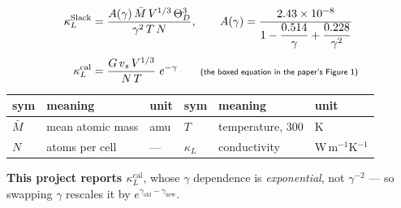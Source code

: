 \begin{frame}

\begin{align}
\kappa_L^{\text{Slack}} &=
  \frac{A(\gamma)\,\bar{M}\,V^{1/3}\,\Theta_D^{3}}{\gamma^{2}\,T\,N},
  \qquad A(\gamma) = \frac{2.43\times10^{-8}}{1 - \dfrac{0.514}{\gamma} + \dfrac{0.228}{\gamma^{2}}} \\[3pt]
\kappa_L^{\text{cal}} &= \frac{G\,v_s\,V^{1/3}}{N\,T}\;e^{-\gamma}
  \qquad\text{\sffamily\scriptsize (the boxed equation in the paper's Figure 1)}
\end{align}

\vspace{1pt}
\begin{center}
{\sffamily\scriptsize
\begin{tabular}{@{}llllll@{}}
\toprule
sym & meaning & unit & sym & meaning & unit \\
\midrule
$\bar{M}$ & mean atomic mass & amu & $T$ & temperature, 300 & K \\
$N$ & atoms per cell & --- & $\kappa_L$ & conductivity & W\,m$^{-1}$K$^{-1}$ \\
\bottomrule
\end{tabular}}
\end{center}

\vspace{1pt}
{\sffamily\scriptsize
\textbf{This project reports $\kappa_L^{\text{cal}}$}, whose $\gamma$ dependence
is \emph{exponential}, not $\gamma^{-2}$ --- so swapping $\gamma$ rescales it by
$e^{\gamma_{\text{old}} - \gamma_{\text{new}}}$.}
\end{frame}

